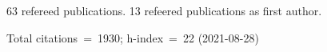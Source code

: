 63 refereed publications. 13 refeered publications as first author.

Total citations~=~1930; h-index~=~22 (2021-08-28)